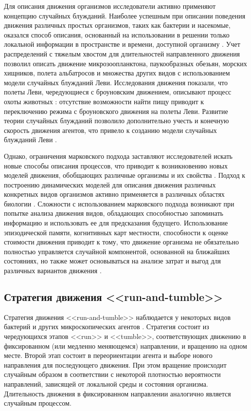Для описания движения организмов исследователи активно применяют концепцию случайных блужданий. Наиболее успешным при описании поведения движения различных простых организмов, таких как бактерии и насекомые, оказался способ описания, основанный на использовании в решении только локальной информации в пространстве и времени, доступной организму \cite{turchin_quantitative_1998}. Учет распределений с тяжелым хвостом для длительностей направленного движения позволил описать движение микрозоопланктона, паукообразных обезьян, морских хищников, полета альбатросов и множества других видов \cite{boyer_modelling_2010} с использованием модели случайных блужданий Леви. Исследования движения показали, что полеты Леви, чередующиеся с броуновским движением, описывают процесс охоты животных \cite{sims_scaling_2008}: отсутствие возможности найти пищу приводит к переключению режима с броуновского движения на полеты Леви. Развитие теории случайных блужданий позволило дополнительно учесть и конечную скорость движения агентов, что привело к созданию модели случайных блужданий Леви \cite{shlesinger_random_1982}.   

Однако, ограничения марковского подхода заставляют исследователей искать новые способы описания процессов, что приводит к возникновению новых моделей движения, обобщающих различные организмы и их свойства \cite{nathan_movement_2008}. Подход к построению динамических моделей для описания движения различных конкретных видов организмов активно применяется в различных областях биологии \cite{berg_random_1993}. Сложности с использованием марковского подхода возникают при попытке анализа движения видов, обладающих способностью запоминать информацию и использовать ее для предсказания будущего. Использование эпизодической памяти, когнитивных карт местности, способности к оценке стоимости движения приводит к тому, что движение организма не обязательно полностью управляется случайной компонентой, основанной на ближайших состояниях, но также может основываться на анализе затрат и выгод для различных вариантов движения \cite{boyer_modelling_2010}.

\subsection{Стратегия движения <<run-and-tumble>>}\label{subsec:ch1/sec1/sub2}

Стратегия движения <<run-and-tumble>> наблюдается у некоторых видов бактерий и других микроскопических агентов \cite{berg_coli_2004}. Стратегия состоит из чередующихся этапов <<run>> и <<tumble>>, соответствующих движению в фиксированном (или медленно меняющемся) направлении, и вращению на одном месте. Второй этап состоит в переориентации агента и выборе нового направления для последующего движения. При этом вращение происходит случайным образом в соответствии с некоторой плотностью вероятности направлений, зависящей от локальной среды и состояния организма. Длительность движения в фиксированном направлении аналогично является случайным процессом. 


